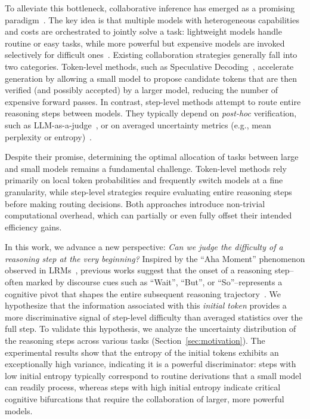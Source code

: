 \documentclass[11pt]{article}
\begin{document}
To alleviate this bottleneck, collaborative inference has emerged as a promising paradigm~\cite{she2025hawkeye, xiao2025proxythinker, qu2025survey}. The key idea is that multiple models with heterogeneous capabilities and costs are orchestrated to jointly solve a task: lightweight models handle routine or easy tasks, while more powerful but expensive models are invoked selectively for difficult ones~\cite{chen2025survey, wang2025mixllm}. 
Existing collaboration strategies generally fall into two categories. Token-level methods, such as Speculative Decoding~\cite{leviathan2023fast, fu2025r2r}, accelerate generation by allowing a small model to propose candidate tokens that are then verified (and possibly accepted) by a larger model, reducing the number of expensive forward passes. 
In contrast, step-level methods attempt to route entire reasoning steps between models. They typically depend on \textit{post-hoc} verification, such as LLM-as-a-judge~\cite{shi2025speccot,pan2025specreason}, or on averaged uncertainty metrics (e.g., mean perplexity or entropy)~\cite{cui2025stepwise, zhang2025entropy}.

Despite their promise, determining the optimal allocation of tasks between large and small models remains a fundamental challenge.
Token-level methods rely primarily on local token probabilities and frequently switch models at a fine granularity, while step-level strategies require evaluating entire reasoning steps before making routing decisions. 
Both approaches introduce non-trivial computational overhead, which can partially or even fully offset their intended efficiency gains. 

In this work, we advance a new perspective: \textit{Can we judge the difficulty of a reasoning step at the very beginning?} Inspired by the ``Aha Moment'' phenomenon observed in LRMs~\cite{guo2025deepseek}, previous works suggest that the onset of a reasoning step--often marked by discourse cues such as ``Wait'', ``But'', or ``So''--represents a cognitive pivot that shapes the entire subsequent reasoning trajectory~\cite{wang2025beyond,yang2025speculative,zeng2025pruning}. We hypothesize that the information associated with this \textit{initial token} provides a more discriminative signal of step-level difficulty than averaged statistics over the full step.
To validate this hypothesis, we analyze the uncertainty distribution of the reasoning steps across various tasks (Section~\ref{sec:motivation}). The experimental results show that the entropy of the initial tokens exhibits an exceptionally high variance, indicating it is a powerful discriminator: steps with low initial entropy typically correspond to routine derivations that a small model can readily process, whereas steps with high initial entropy indicate critical cognitive bifurcations that require the collaboration of larger, more powerful models.
\end{document}
